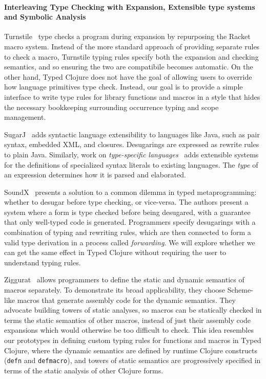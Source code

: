 \documentclass[11pt]{iuthesis}
\begin{document}

\paragraph{Interleaving Type Checking with Expansion, Extensible type systems and Symbolic Analysis}

Turnstile~\cite{Chang2017TSM} type checks a program during expansion
by repurposing the Racket macro system.
Instead of the more standard approach of providing separate rules to check a macro, Turnstile
typing rules specify both the expansion and checking semantics, and so ensuring the
two are compatibile becomes automatic.
On the other hand, Typed Clojure does not have the goal of allowing users to override
how language primitives type check. Instead, our goal is to provide
a simple interface to write type rules for library functions and macros
in a style that hides the necessary bookkeeping surrounding occurrence
typing and scope management.

SugarJ~\cite{Erdweg2011SJ}
adds syntactic language extensibility to languages like Java, such as pair
syntax, embedded XML, and closures.
Desugarings are expressed as rewrite rules to plain Java.
Similarly, work on \emph{type-specific languages}~\cite{omar2014safely}
adds extensible systems for the definitions of specialized syntax literals
to existing languages.
The \emph{type} of an expression determines how it is parsed and elaborated.

SoundX~\cite{Lorenzen2016STS} presents a solution to a common
dilemma in typed metaprogramming: whether to desugar before
type checking, or vice-versa.
The authors present a system where a form is type checked before 
being desugared, with a guarantee that only well-typed code is generated.
Programmers specify desugarings with a combination of typing and rewriting rules, 
which are then connected to form a valid type derivation
in a process called \emph{forwarding}.
We will explore whether we can get the same effect in Typed Clojure
without requiring the user to understand typing rules.

Ziggurat~\cite{Fisher06staticanalysis} allows programmers to define
the static and dynamic semantics of macros separately. To demonstrate its
broad applicability, they choose Scheme-like macros that generate assembly code
for the dynamic semantics.
They advocate building towers of static analyses, so
macros can be statically checked in terms the static semantics of other macros, instead
of just their assembly code expansions which would otherwise be too difficult to check.
This idea resembles our prototypes in defining custom typing rules for functions and macros in Typed Clojure,
where the dynamic semantics are defined by runtime Clojure constructs (\texttt{defn}
and \texttt{defmacro}), and towers of static semantics are progressively specified in terms of the static
analysis of other Clojure forms.
\end{document}
